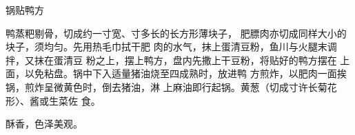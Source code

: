 \begin{recipe}{锅贴鸭方}

\ingredients


\cooking

鸭蒸粑剔骨，切成约一寸宽、寸多长的长方形薄块子， 肥膘肉亦切成同样大小的块子，须均匀。先用热毛巾拭干肥 肉的水气，抹上蛋清豆粉，鱼川与火腿末调拌，又抹在蛋清豆 粉之上，摆上鸭方，盘内先撒上干豆粉，将贴好的鸭方摆在 上面，以免粘盘。锅中下入适量猪油烧至四成熟时，放进鸭 方煎炸，以肥肉一面挨锅，煎炸呈微黄色时，倒去猪油，淋 上麻油即行起锅。黄葱（切成寸许长菊花形〉、酱或生菜佐 食。

\notes

酥香，色泽美观。

\end{recipe}

